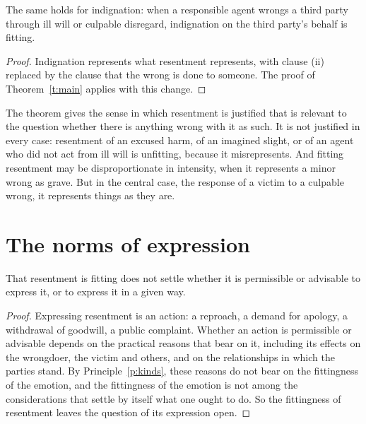 \documentclass{situationist-preprint}
\begin{document}
\begin{corollary}\label{c:indig}
The same holds for indignation: when a responsible agent wrongs a third party through ill will or culpable disregard, indignation on the third party's behalf is fitting.
\end{corollary}

\begin{proof}
Indignation represents what resentment represents, with clause (ii) replaced by the clause that the wrong is done to someone. The proof of Theorem~\ref{t:main} applies with this change.
\end{proof}

The theorem gives the sense in which resentment is justified that is relevant to the question whether there is anything wrong with it as such. It is not justified in every case: resentment of an excused harm, of an imagined slight, or of an agent who did not act from ill will is unfitting, because it misrepresents. And fitting resentment may be disproportionate in intensity, when it represents a minor wrong as grave. But in the central case, the response of a victim to a culpable wrong, it represents things as they are.

\section{The norms of expression}\label{s:norms}

\begin{proposition}\label{p:express}
That resentment is fitting does not settle whether it is permissible or advisable to express it, or to express it in a given way.
\end{proposition}

\begin{proof}
Expressing resentment is an action: a reproach, a demand for apology, a withdrawal of goodwill, a public complaint. Whether an action is permissible or advisable depends on the practical reasons that bear on it, including its effects on the wrongdoer, the victim and others, and on the relationships in which the parties stand. By Principle~\ref{p:kinds}, these reasons do not bear on the fittingness of the emotion, and the fittingness of the emotion is not among the considerations that settle by itself what one ought to do. So the fittingness of resentment leaves the question of its expression open.
\end{proof}
\end{document}

